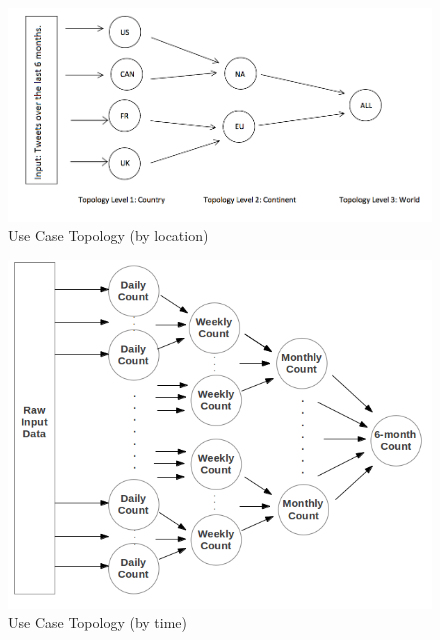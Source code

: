 \documentclass[a4paper]{article}
\begin{document}
\begin{figure}[!htbp]
\centering
\includegraphics[width=1.0\textwidth]{images/SampleUseCaseTopology.png}
\caption{Use Case Topology (by location)}
\label{fig:UseCaseTopology}
\end{figure}

\begin{figure}[!htbp]
\centering
\includegraphics[width=1.0\textwidth]{images/topology_by_time.png}
\caption{Use Case Topology (by time)}
\label{fig:TopologyByTime}
\end{figure}
\end{document}
